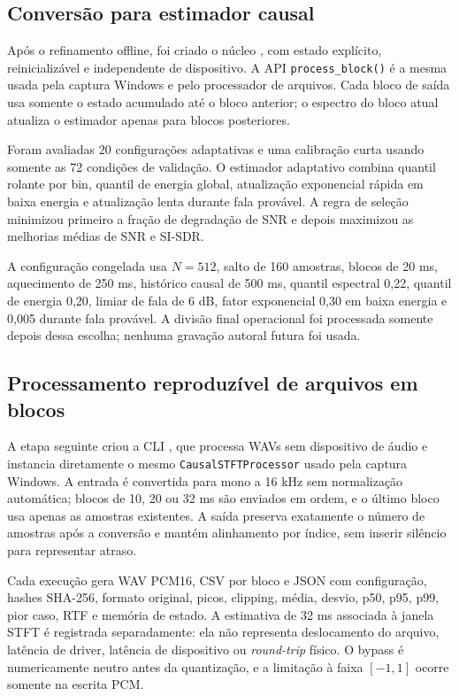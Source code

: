 \subsection{Conversão para estimador causal}

Após o refinamento offline, foi criado o núcleo , com estado explícito, reinicializável e independente de dispositivo. A API \texttt{process\_block()} é a mesma usada pela captura Windows e pelo processador de arquivos. Cada bloco de saída usa somente o estado acumulado até o bloco anterior; o espectro do bloco atual atualiza o estimador apenas para blocos posteriores.

Foram avaliadas 20 configurações adaptativas e uma calibração curta usando somente as 72 condições de validação. O estimador adaptativo combina quantil rolante por bin, quantil de energia global, atualização exponencial rápida em baixa energia e atualização lenta durante fala provável. A regra de seleção minimizou primeiro a fração de degradação de SNR e depois maximizou as melhorias médias de SNR e SI-SDR.

A configuração congelada usa \(N=512\), salto de 160 amostras, blocos de 20 ms, aquecimento de 250 ms, histórico causal de 500 ms, quantil espectral 0,22, quantil de energia 0,20, limiar de fala de 6 dB, fator exponencial 0,30 em baixa energia e 0,005 durante fala provável. A divisão final operacional foi processada somente depois dessa escolha; nenhuma gravação autoral futura foi usada.

\subsection{Processamento reproduzível de arquivos em blocos}

A etapa seguinte criou a CLI , que processa WAVs sem dispositivo de áudio e instancia diretamente o mesmo \texttt{CausalSTFTProcessor} usado pela captura Windows. A entrada é convertida para mono a 16 kHz sem normalização automática; blocos de 10, 20 ou 32 ms são enviados em ordem, e o último bloco usa apenas as amostras existentes. A saída preserva exatamente o número de amostras após a conversão e mantém alinhamento por índice, sem inserir silêncio para representar atraso.

Cada execução gera WAV PCM16, CSV por bloco e JSON com configuração, hashes SHA-256, formato original, picos, clipping, média, desvio, p50, p95, p99, pior caso, RTF e memória de estado. A estimativa de 32 ms associada à janela STFT é registrada separadamente: ela não representa deslocamento do arquivo, latência de driver, latência de dispositivo ou \textit{round-trip} físico. O bypass é numericamente neutro antes da quantização, e a limitação à faixa \([-1,1]\) ocorre somente na escrita PCM.

